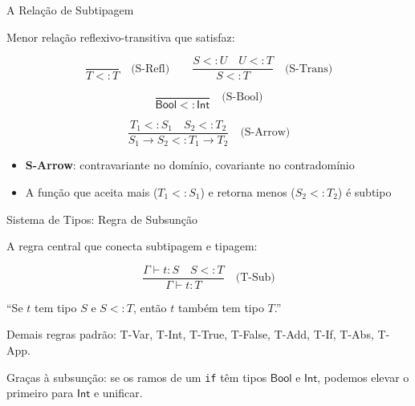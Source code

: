 \begin{frame}{A Relação de Subtipagem}

    Menor relação reflexivo-transitiva que satisfaz:

    \[\frac{}{T <: T} \quad\text{(S-Refl)} \qquad \frac{S <: U \quad U <: T}{S <: T} \quad\text{(S-Trans)}\]

    \[\frac{}{\mathsf{Bool} <: \mathsf{Int}} \quad\text{(S-Bool)}\]

    \[\frac{T_1 <: S_1 \quad S_2 <: T_2}{S_1 \to S_2 <: T_1 \to T_2} \quad\text{(S-Arrow)}\]

    \begin{itemize}

        \item
        \textbf{S-Arrow}: contravariante no domínio, covariante no
        contradomínio
        \item
        A função que aceita mais (\(T_1 <: S_1\)) e retorna menos
        (\(S_2 <: T_2\)) é subtipo
    \end{itemize}
\end{frame}

\begin{frame}[fragile]{Sistema de Tipos: Regra de Subsunção}

    A regra central que conecta subtipagem e tipagem:

    \[\frac{\Gamma \vdash t : S \quad S <: T}{\Gamma \vdash t : T} \quad\text{(T-Sub)}\]

    ``Se \(t\) tem tipo \(S\) e \(S <: T\), então \(t\) também tem tipo
    \(T\).''

    Demais regras padrão: T-Var, T-Int, T-True, T-False, T-Add, T-If, T-Abs,
    T-App.

    Graças à subsunção: se os ramos de um \texttt{if} têm
    tipos \(\mathsf{Bool}\) e \(\mathsf{Int}\), podemos elevar o primeiro
    para \(\mathsf{Int}\) e unificar.
\end{frame}

